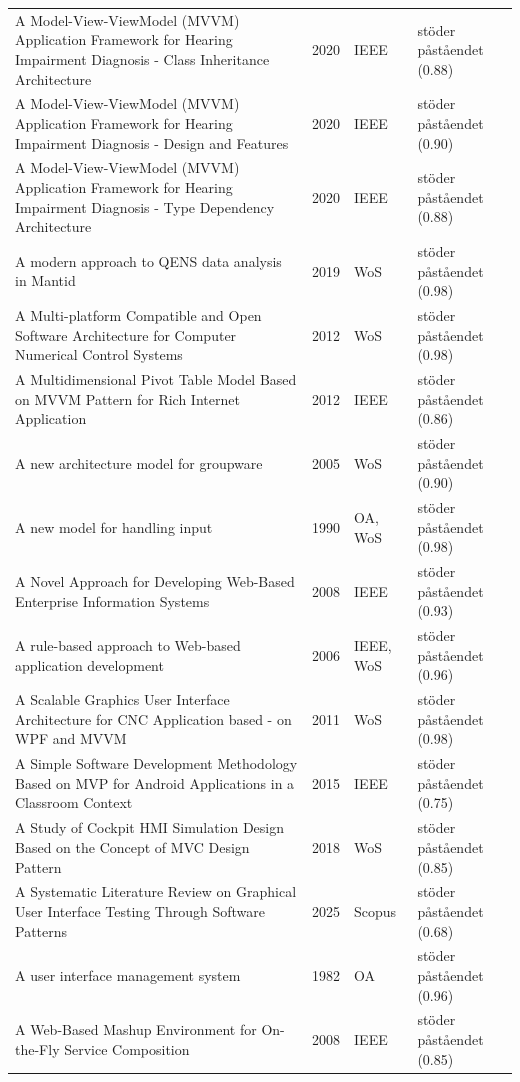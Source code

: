 \begin{longtable}{@{}%
  >{\raggedright\arraybackslash}p{}c%
  >{\raggedright\arraybackslash}p{}%
  >{\raggedright\arraybackslash}p{}@{}}
A Model-View-ViewModel (MVVM) Application Framework for Hearing Impairment Diagnosis - Class Inheritance Architecture & 2020 & IEEE & stöder påståendet (0.88) \\
A Model-View-ViewModel (MVVM) Application Framework for Hearing Impairment Diagnosis - Design and Features & 2020 & IEEE & stöder påståendet (0.90) \\
A Model-View-ViewModel (MVVM) Application Framework for Hearing Impairment Diagnosis - Type Dependency Architecture & 2020 & IEEE & stöder påståendet (0.88) \\
A modern approach to QENS data analysis in Mantid & 2019 & WoS & stöder påståendet (0.98) \\
A Multi-platform Compatible and Open Software Architecture for Computer Numerical Control Systems & 2012 & WoS & stöder påståendet (0.98) \\
A Multidimensional Pivot Table Model Based on MVVM Pattern for Rich Internet Application & 2012 & IEEE & stöder påståendet (0.86) \\
A new architecture model for groupware & 2005 & WoS & stöder påståendet (0.90) \\
A new model for handling input & 1990 & OA, WoS & stöder påståendet (0.98) \\
A Novel Approach for Developing Web-Based Enterprise Information Systems & 2008 & IEEE & stöder påståendet (0.93) \\
A rule-based approach to Web-based application development & 2006 & IEEE, WoS & stöder påståendet (0.96) \\
A Scalable Graphics User Interface Architecture for CNC Application based - on WPF and MVVM & 2011 & WoS & stöder påståendet (0.98) \\
A Simple Software Development Methodology Based on MVP for Android Applications in a Classroom Context & 2015 & IEEE & stöder påståendet (0.75) \\
A Study of Cockpit HMI Simulation Design Based on the Concept of MVC Design Pattern & 2018 & WoS & stöder påståendet (0.85) \\
A Systematic Literature Review on Graphical User Interface Testing Through Software Patterns & 2025 & Scopus & stöder påståendet (0.68) \\
A user interface management system & 1982 & OA & stöder påståendet (0.96) \\
A Web-Based Mashup Environment for On-the-Fly Service Composition & 2008 & IEEE & stöder påståendet (0.85) \\

\end{longtable}

